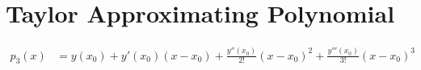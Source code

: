 \section{Taylor Approximating Polynomial}
	\begin{align}
		p_{3}(x) &= y(x_{0}) + y'(x_{0})(x-x_{0}) + \frac{y''(x_{0})}{2!}(x - x_{0})^{2} + \frac{y'''(x_{0})}{3!}(x - x_{0})^{3}&
	\end{align}

